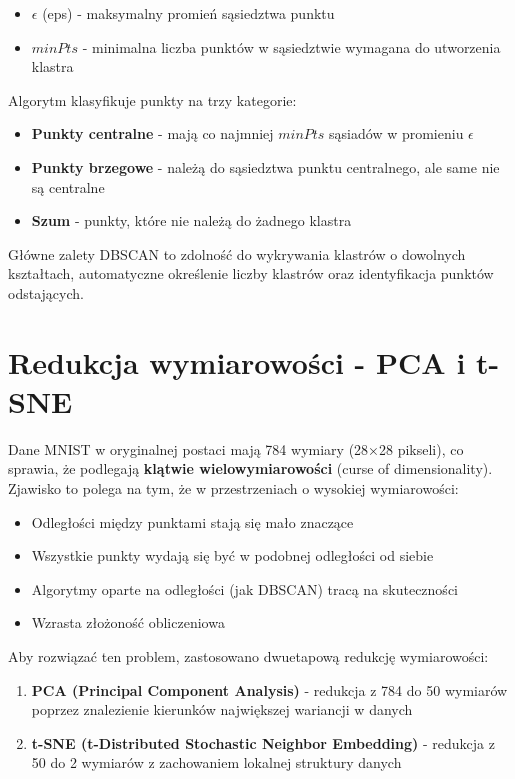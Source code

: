 \documentclass[12pt,a4paper]{article}
\begin{document}
\begin{itemize}
    \item $\epsilon$ (eps) - maksymalny promień sąsiedztwa punktu
    \item $minPts$ - minimalna liczba punktów w sąsiedztwie wymagana do utworzenia klastra
\end{itemize}

Algorytm klasyfikuje punkty na trzy kategorie:
\begin{itemize}
    \item \textbf{Punkty centralne} - mają co najmniej $minPts$ sąsiadów w promieniu $\epsilon$
    \item \textbf{Punkty brzegowe} - należą do sąsiedztwa punktu centralnego, ale same nie są centralne
    \item \textbf{Szum} - punkty, które nie należą do żadnego klastra
\end{itemize}

\noindent Główne zalety DBSCAN to zdolność do wykrywania klastrów o dowolnych kształtach, automatyczne określenie liczby klastrów oraz identyfikacja punktów odstających.

\section{Redukcja wymiarowości - PCA i t-SNE}
Dane MNIST w oryginalnej postaci mają 784 wymiary (28×28 pikseli), co sprawia, że podlegają \textbf{klątwie wielowymiarowości} (curse of dimensionality). Zjawisko to polega na tym, że w przestrzeniach o wysokiej wymiarowości:
\begin{itemize}
\item Odległości między punktami stają się mało znaczące
\item Wszystkie punkty wydają się być w podobnej odległości od siebie
\item Algorytmy oparte na odległości (jak DBSCAN) tracą na skuteczności
\item Wzrasta złożoność obliczeniowa
\end{itemize}
Aby rozwiązać ten problem, zastosowano dwuetapową redukcję wymiarowości:
\begin{enumerate}
\item \textbf{PCA (Principal Component Analysis)} - redukcja z 784 do 50 wymiarów poprzez znalezienie kierunków największej wariancji w danych
\item \textbf{t-SNE (t-Distributed Stochastic Neighbor Embedding)} - redukcja z 50 do 2 wymiarów z zachowaniem lokalnej struktury danych
\end{enumerate}
\end{document}
